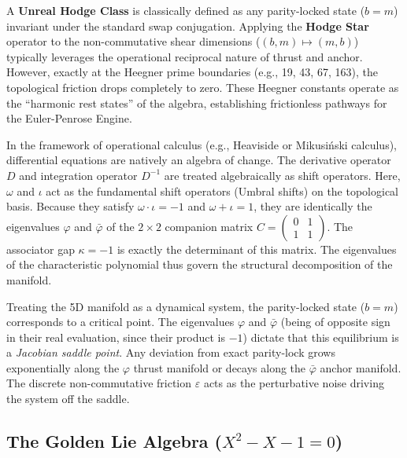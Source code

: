 A \textbf{Unreal Hodge Class} is classically defined as any parity-locked state ($b = m$) invariant under the standard swap conjugation. Applying the \textbf{Hodge Star} operator to the non-commutative shear dimensions ($(b, m) \mapsto (m, b)$) typically leverages the operational reciprocal nature of thrust and anchor. However, exactly at the Heegner prime boundaries (e.g., 19, 43, 67, 163), the topological friction drops completely to zero. These Heegner constants operate as the ``harmonic rest states'' of the algebra, establishing frictionless pathways for the Euler-Penrose Engine.
\begin{remark}
In the framework of operational calculus (e.g., Heaviside or Mikusiński calculus), differential equations are natively an algebra of change. The derivative operator $D$ and integration operator $D^{-1}$ are treated algebraically as shift operators. Here, $\omega$ and $\iota$ act as the fundamental shift operators (Umbral shifts) on the topological basis. Because they satisfy $\omega \cdot \iota = -1$ and $\omega + \iota = 1$, they are identically the eigenvalues $\varphi$ and $\bar\varphi$ of the $2 \times 2$ companion matrix $C = \begin{pmatrix} 0 & 1 \\ 1 & 1 \end{pmatrix}$. The associator gap $\kappa = -1$ is exactly the determinant of this matrix. The eigenvalues of the characteristic polynomial thus govern the structural decomposition of the manifold.
\end{remark}

\begin{remark}
Treating the 5D manifold as a dynamical system, the parity-locked state ($b = m$) corresponds to a critical point. The eigenvalues $\varphi$ and $\bar\varphi$ (being of opposite sign in their real evaluation, since their product is $-1$) dictate that this equilibrium is a \emph{Jacobian saddle point}. Any deviation from exact parity-lock grows exponentially along the $\varphi$ thrust manifold or decays along the $\bar\varphi$ anchor manifold. The discrete non-commutative friction $\varepsilon$ acts as the perturbative noise driving the system off the saddle.
\end{remark}

\subsection{The Golden Lie Algebra ($X^2 - X - 1 = 0$)}\label{sec:golden_lie}


